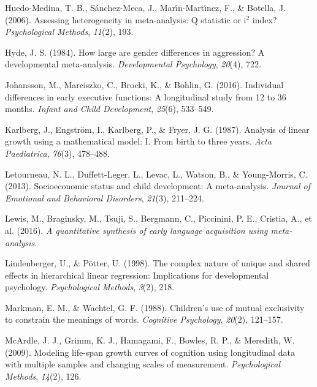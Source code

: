 \documentclass[
  man]{apa6}
\newlength{\cslhangindent}
\newlength{\cslentryspacingunit} %
\newenvironment{CSLReferences}[2] %
 {%
  \setlength{\parindent}{0pt}
  \ifodd #1
  \let\oldpar\par
  \def\par{\hangindent=\cslhangindent\oldpar}
  \fi
  \setlength{\parskip}{#2\cslentryspacingunit}
 }%
 {}
\begin{document}
\begin{CSLReferences}{1}{0}
\leavevmode{}%
Huedo-Medina, T. B., Sánchez-Meca, J., Marı́n-Martı́nez, F., \& Botella, J. (2006). Assessing heterogeneity in meta-analysis: Q statistic or i\(^2\) index? \emph{Psychological Methods}, \emph{11}(2), 193.

\leavevmode{}%
Hyde, J. S. (1984). How large are gender differences in aggression? A developmental meta-analysis. \emph{Developmental Psychology}, \emph{20}(4), 722.

\leavevmode{}%
Johansson, M., Marciszko, C., Brocki, K., \& Bohlin, G. (2016). Individual differences in early executive functions: A longitudinal study from 12 to 36 months. \emph{Infant and Child Development}, \emph{25}(6), 533--549.

\leavevmode{}%
Karlberg, J., Engström, I., Karlberg, P., \& Fryer, J. G. (1987). Analysis of linear growth using a mathematical model: I. From birth to three years. \emph{Acta Paediatrica}, \emph{76}(3), 478--488.

\leavevmode{}%
Letourneau, N. L., Duffett-Leger, L., Levac, L., Watson, B., \& Young-Morris, C. (2013). Socioeconomic status and child development: A meta-analysis. \emph{Journal of Emotional and Behavioral Disorders}, \emph{21}(3), 211--224.

\leavevmode{}%
Lewis, M., Braginsky, M., Tsuji, S., Bergmann, C., Piccinini, P. E., Cristia, A., et al. (2016). \emph{A quantitative synthesis of early language acquisition using meta-analysis}.

\leavevmode{}%
Lindenberger, U., \& Pötter, U. (1998). The complex nature of unique and shared effects in hierarchical linear regression: Implications for developmental psychology. \emph{Psychological Methods}, \emph{3}(2), 218.

\leavevmode{}%
Markman, E. M., \& Wachtel, G. F. (1988). Children's use of mutual exclusivity to constrain the meanings of words. \emph{Cognitive Psychology}, \emph{20}(2), 121--157.

\leavevmode{}%
McArdle, J. J., Grimm, K. J., Hamagami, F., Bowles, R. P., \& Meredith, W. (2009). Modeling life-span growth curves of cognition using longitudinal data with multiple samples and changing scales of measurement. \emph{Psychological Methods}, \emph{14}(2), 126.


\end{CSLReferences}
\end{document}
